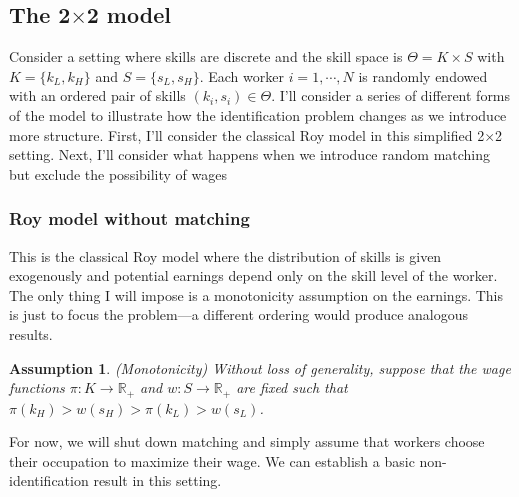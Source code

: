 \documentclass[12 pt]{article}
\newtheorem{assumption}{Assumption} %
\begin{document}
\subsection{The 2$\times$2 model}

Consider a setting where skills are discrete and the skill space is $\Theta = K \times S$ with $K=\{k_L,k_H\}$ and $S=\{s_L,s_H\}$. Each worker $i=1,\cdots,N$ is randomly endowed with an ordered pair of skills $(k_i,s_i)\in\Theta$. I'll consider a series of different forms of the model to illustrate how the identification problem changes as we introduce more structure. First, I'll consider the classical Roy model in this simplified 2$\times$2 setting. Next, I'll consider what happens when we introduce random matching but exclude the possibility of wages

\subsubsection{Roy model without matching}

This is the classical Roy model where the distribution of skills is given exogenously and potential earnings depend only on the skill level of the worker. The only thing I will impose is a monotonicity assumption on the earnings. This is just to focus the problem---a different ordering would produce analogous results.

\begin{assumption}(Monotonicity)
	Without loss of generality, suppose that the wage functions $\pi:K\to\mathbb{R}_+$ and $w:S\to\mathbb{R}_+$ are fixed such that $\pi(k_H) > w(s_H) > \pi(k_L) > w(s_L)$.
	\label{ass:mono}
\end{assumption}

For now, we will shut down matching and simply assume that workers choose their occupation to maximize their wage. We can establish a basic non-identification result in this setting.
\end{document}
